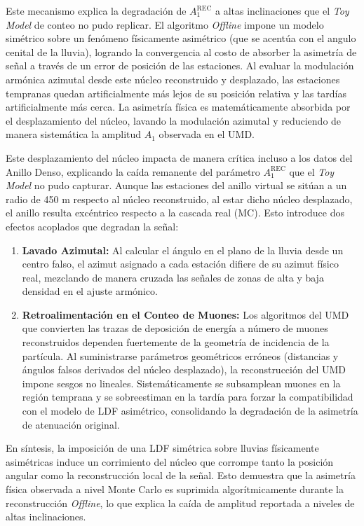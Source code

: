 Este mecanismo explica la degradación de $A_1^{\mathrm{REC}}$ a altas inclinaciones que el \textit{Toy Model} de conteo no pudo replicar. El algoritmo \textit{Offline} impone un modelo simétrico sobre un fenómeno físicamente asimétrico (que se acentúa con el angulo cenital de la lluvia), logrando la convergencia al costo de absorber la asimetría de señal a través de un error de posición de las estaciones. Al evaluar la modulación armónica azimutal desde este núcleo reconstruido y desplazado, las estaciones tempranas quedan artificialmente más lejos de su posición relativa y las tardías artificialmente más cerca. La asimetría física es matemáticamente absorbida por el desplazamiento del núcleo, lavando la modulación azimutal y reduciendo de manera sistemática la amplitud $A_1$ observada en el UMD.

Este desplazamiento del núcleo impacta de manera crítica incluso a los datos del Anillo Denso, explicando la caída remanente del parámetro $A_1^{\mathrm{REC}}$ que el \textit{Toy Model} no pudo capturar. Aunque las estaciones del anillo virtual se sitúan a un radio de 450 m respecto al núcleo reconstruido, al estar dicho núcleo desplazado, el anillo resulta excéntrico respecto a la cascada real (MC). Esto introduce dos efectos acoplados que degradan la señal:

\begin{enumerate}
	\item \textbf{Lavado Azimutal:} Al calcular el ángulo en el plano de la lluvia desde un centro falso, el azimut asignado a cada estación difiere de su azimut físico real, mezclando de manera cruzada las señales de zonas de alta y baja densidad en el ajuste armónico.
	\item \textbf{Retroalimentación en el Conteo de Muones:} Los algoritmos del UMD que convierten las trazas de deposición de energía a número de muones reconstruidos dependen fuertemente de la geometría de incidencia de la partícula. Al suministrarse parámetros geométricos erróneos (distancias y ángulos falsos derivados del núcleo desplazado), la reconstrucción del UMD impone sesgos no lineales. Sistemáticamente se subsamplean muones en la región temprana y se sobreestiman en la tardía para forzar la compatibilidad con el modelo de LDF asimétrico, consolidando la degradación de la asimetría de atenuación original.
\end{enumerate}

En síntesis, la imposición de una LDF simétrica sobre lluvias físicamente asimétricas induce un corrimiento del núcleo que corrompe tanto la posición angular como la reconstrucción local de la señal. Esto demuestra que la asimetría física observada a nivel Monte Carlo es suprimida algorítmicamente durante la reconstrucción \textit{Offline}, lo que explica la caída de amplitud reportada a niveles de altas inclinaciones.

